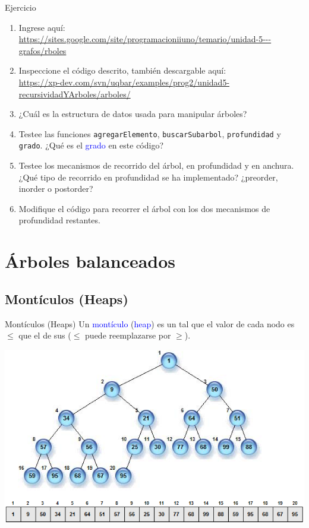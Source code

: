 \documentclass[handout]{beamer} %
\newcommand{\blue}[1]{\textcolor{blue}{#1}}
\newcommand{\redb}[1]{{\color{red!70!black}{#1}}}
\newcommand{\green}[1]{{\color{green!70!black}{#1}}}
\begin{document}
\begin{frame}{Ejercicio}
    \begin{enumerate}
        \item Ingrese aquí:\\
        \blue{\tiny \url{https://sites.google.com/site/programacioniiuno/temario/unidad-5---grafos/rboles}}
        \item Inspeccione el código descrito, también descargable aquí:\\
        \blue{\tiny \url{https://xp-dev.com/svn/uqbar/examples/prog2/unidad5-recursividadYArboles/arboles/}}
        \item ¿Cuál es la estructura de datos usada para manipular árboles?
        \item Testee las funciones \texttt{agregarElemento}, \texttt{buscarSubarbol}, \texttt{profundidad} y \texttt{grado}. ¿Qué es el \blue{grado} en este código?
        \item Testee los mecanismos de recorrido del árbol, en profundidad y en anchura. ¿Qué tipo de recorrido en profundidad se ha implementado? ¿preorder, inorder o postorder?
        \item Modifique el código para recorrer el árbol con los dos mecanismos de profundidad restantes. \green{(+5 pts)}
    \end{enumerate}
\end{frame}

\section{Árboles balanceados}

\subsection{Montículos (Heaps)}

\begin{frame}{Montículos (Heaps)}
    Un \blue{montículo} (\blue{heap}) es un \redb{árbol completo} tal que el valor de cada nodo es $\leq$ que el de sus \redb{descendientes} {\small ($\leq$ puede reemplazarse por $\geq$)}.
    \begin{center}
        \includegraphics[width=.9\textwidth]{./image/cap3/heap}
    \end{center}
\end{frame}
\end{document}
